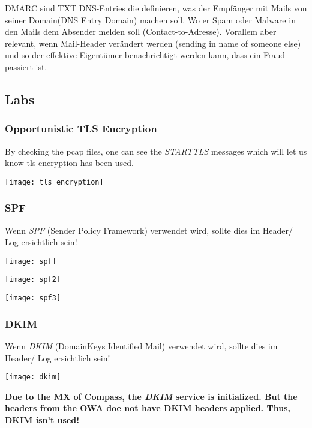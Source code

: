 DMARC sind TXT DNS-Entries die definieren, was der Empfänger mit Mails von seiner Domain(DNS Entry Domain) machen soll. 
Wo er Spam oder Malware in den Mails dem Absender melden soll (Contact-to-Adresse). 
Vorallem aber relevant, wenn Mail-Header verändert werden (sending in name of someone else) und so der effektive Eigentümer benachrichtigt werden kann, dass ein Fraud passiert ist.

\newpage

\subsection{Labs}

\subsubsection{Opportunistic TLS Encryption}
By checking the pcap files, one can see the \textit{STARTTLS} messages which will let us know tls encryption has been used.

\begin{center}
    \texttt{[image: tls\_encryption]}
\end{center}

\subsubsection{SPF}
Wenn \textit{SPF} (Sender Policy Framework) verwendet wird, sollte dies im Header/ Log ersichtlich sein!
\begin{center}
    \texttt{[image: spf]}
\end{center}
\texttt{[image: spf2]}
\begin{center}
    \texttt{[image: spf3]}
\end{center}

\newpage

\subsubsection{DKIM}
Wenn \textit{DKIM} (DomainKeys Identified Mail) verwendet wird, sollte dies im Header/ Log ersichtlich sein!

\begin{center}
    \texttt{[image: dkim]}
\end{center}

\textbf{Due to the MX of Compass, the \textit{DKIM} service is initialized. But the headers from the OWA doe not have DKIM headers applied. Thus, DKIM isn't used!}

